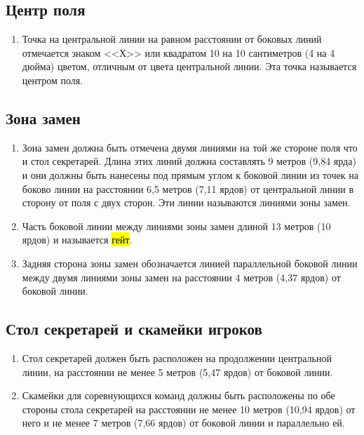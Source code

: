 \documentclass[../main.tex]{subfiles}
\begin{document}
\subsection{Центр поля}
\begin{enumerate}
  \item Точка на центральной линии на равном расстоянии от боковых линий отмечается знаком <<Х>> или квадратом 10 на 10 сантиметров (4 на 4 дюйма) цветом, отличным от цвета центральной линии. Эта точка называется центром поля.
\end{enumerate}

\subsection{Зона замен}
\begin{enumerate}
  \item Зона замен должна быть отмечена двумя линиями на той же стороне поля что и стол секретарей.\newline
  Длина этих линий должна составлять 9 метров (9,84 ярда) и они должны быть нанесены под прямым углом к боковой линии из точек на боково линии на расстоянии 6,5 метров (7,11 ярдов) от центральной линии в сторону от поля с двух сторон. Эти линии называются линиями зоны замен.
  \item Часть боковой линии между линиями зоны замен длиной 13 метров (10 ярдов) и называется {\hl{гейт}}.
  \item Задняя сторона зоны замен обозначается линией параллельной боковой линии между двумя линиями зоны замен на расстоянии 4 метров (4,37 ярдов) от боковой линии.
\end{enumerate}

\subsection{Стол секретарей и скамейки игроков}
\begin{enumerate}
  \item Стол секретарей должен быть расположен на продолжении центральной линии, на расстоянии не менее 5 метров (5,47 ярдов) от боковой линии.
  \item Скамейки для соревнующихся команд должны быть расположены по обе стороны стола секретарей на расстоянии не менее 10 метров (10,94 ярдов) от него и не менее 7 метров (7,66 ярдов) от боковой линии и параллельно ей.
\end{enumerate}
\end{document}
